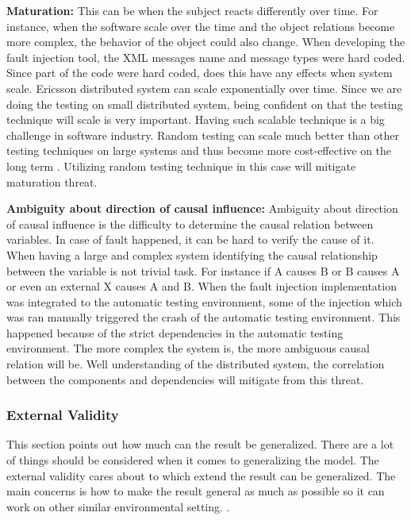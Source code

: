 \textbf{Maturation:} This can be when the subject reacts differently over time. For instance, when the software scale over the time and the object relations become more complex, the behavior of the object could also change. When developing the fault injection tool, the XML messages name and message types were hard coded. Since part of the code were hard coded, does this have any effects when system scale. Ericsson distributed system can scale exponentially over time. Since we are doing the testing on small distributed system, being confident on that the testing technique will scale is very important. Having such scalable technique is a big challenge in software industry. Random testing can scale much better than other testing techniques on large systems and thus become more cost-effective on the long term \cite{random}. Utilizing random testing technique in this case will mitigate maturation threat.

\textbf{Ambiguity about direction of causal influence:} 
Ambiguity about direction of causal influence is the difficulty to determine the causal relation between variables. In case of fault happened, it can be hard to verify the cause of it. When having a large and complex system identifying the causal relationship between the variable is not trivial task. For instance if A causes B or B causes A or even an external X causes A and B. When the fault injection implementation was integrated to the automatic testing environment, some of the injection which was ran manually triggered the crash of the automatic testing environment. This happened because of the strict dependencies in the automatic testing environment. The more complex the system is, the more ambiguous causal relation will be. Well understanding of the distributed system, the correlation between the components and dependencies will mitigate from this threat. 


\subsubsection{External Validity}
This section points out how much can the result be generalized. There are a lot of things should be considered when it comes to generalizing the model. The external validity cares about to which extend the result can be generalized. The main concerns is how to make the result general as much as possible so it can work on other similar environmental setting. \cite{experimentation}.

